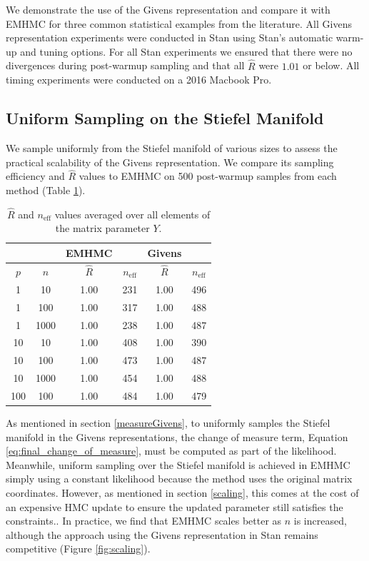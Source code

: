 \documentclass[ba]{imsart}
\numberwithin{equation}{section}
\theoremstyle{plain}
\begin{document}
We demonstrate the use of the Givens representation and compare it with EMHMC for three common statistical examples from the literature. All Givens representation experiments were conducted in Stan using Stan's automatic warm-up and tuning options. For all Stan experiments we ensured that there were no divergences during post-warmup sampling and that all $\hat{R}$ were $1.01$ or below. All timing experiments were conducted on a 2016 Macbook Pro.


\subsection{Uniform Sampling on the Stiefel Manifold} \label{scaling_examples}
We sample uniformly from the Stiefel manifold of various sizes to assess the practical scalability of the Givens representation. We compare its sampling efficiency and $\hat{R}$ values to EMHMC on 500 post-warmup samples from each method (Table \ref{tab:rhat_neff}).  

\begin{table}
\begin{tabular}{|cc||cc|cc|}
\hline
& & EMHMC & & Givens &\\
\hline
$p$ & $n$  & $\hat{R}$ & $n_{\mathrm{eff}}$ & $\hat{R}$ & $n_{\mathrm{eff}}$\\
\hline
\hline
1 & 10 & 1.00 & 231 & 1.00 & 496\\
1 & 100 & 1.00 & 317 & 1.00 & 488\\
1 & 1000 & 1.00 & 238 & 1.00 & 487 \\
\hline
10 & 10 & 1.00 & 408 & 1.00  & 390\\
10 & 100 & 1.00 & 473 & 1.00 & 487\\
10 & 1000 & 1.00 & 454 & 1.00  & 488 \\
\hline
100 & 100 & 1.00 & 484 & 1.00 & 479 \\
\hline
\end{tabular}
\caption{$\hat{R}$ and $n_{\mathrm{eff}}$ values averaged over all elements of the matrix parameter $Y$. }
\label{tab:rhat_neff}
\end{table}

\noindent As mentioned in section \ref{measureGivens}, to uniformly samples the Stiefel manifold in the Givens representations, the change of measure term, Equation \ref{eq:final_change_of_measure}, must be computed as part of the likelihood. Meanwhile, uniform sampling over the Stiefel manifold is achieved in EMHMC simply using a constant likelihood because the method uses the original matrix coordinates. However, as mentioned in section \ref{scaling}, this comes at the cost of an expensive HMC update to ensure the updated parameter still satisfies the constraints.. In practice, we find that EMHMC scales better as $n$ is increased, although the approach using the Givens representation in Stan remains competitive (Figure \ref{fig:scaling}).
\end{document}
